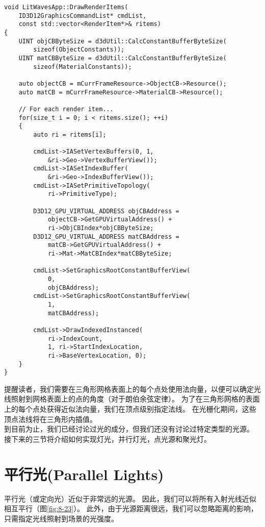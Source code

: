 \begin{lstlisting}
void LitWavesApp::DrawRenderItems(
    ID3D12GraphicsCommandList* cmdList, 
    const std::vector<RenderItem*>& ritems)
{
    UINT objCBByteSize = d3dUtil::CalcConstantBufferByteSize(
        sizeof(ObjectConstants));
    UINT matCBByteSize = d3dUtil::CalcConstantBufferByteSize(
        sizeof(MaterialConstants));

    auto objectCB = mCurrFrameResource->ObjectCB->Resource();
    auto matCB = mCurrFrameResource->MaterialCB->Resource();

    // For each render item...
    for(size_t i = 0; i < ritems.size(); ++i)
    {
        auto ri = ritems[i];

        cmdList->IASetVertexBuffers(0, 1, 
            &ri->Geo->VertexBufferView());
        cmdList->IASetIndexBuffer(
            &ri->Geo->IndexBufferView());
        cmdList->IASetPrimitiveTopology(
            ri->PrimitiveType);

        D3D12_GPU_VIRTUAL_ADDRESS objCBAddress = 
            objectCB->GetGPUVirtualAddress() + 
            ri->ObjCBIndex*objCBByteSize;
        D3D12_GPU_VIRTUAL_ADDRESS matCBAddress = 
            matCB->GetGPUVirtualAddress() + 
            ri->Mat->MatCBIndex*matCBByteSize;

        cmdList->SetGraphicsRootConstantBufferView(
            0, 
            objCBAddress);
        cmdList->SetGraphicsRootConstantBufferView(
            1, 
            matCBAddress);

        cmdList->DrawIndexedInstanced(
            ri->IndexCount, 
            1, ri->StartIndexLocation, 
            ri->BaseVertexLocation, 0);
    }
}
\end{lstlisting}

\begin{flushleft}
提醒读者，我们需要在三角形网格表面上的每个点处使用法向量，以便可以确定光线照射到网格表面上的点的角度（对于朗伯余弦定律）。 为了在三角形网格的表面上的每个点处获得近似法向量，我们在顶点级别指定法线。 在光栅化期间，这些顶点法线将在三角形内插值。\\
到目前为止，我们已经讨论过光的成分，但我们还没有讨论过特定类型的光源。 接下来的三节将介绍如何实现灯光，并行灯光，点光源和聚光灯。\\
\end{flushleft}

\section{平行光(Parallel Lights)}
\begin{flushleft}
平行光（或定向光）近似于非常远的光源。 因此，我们可以将所有入射光线近似相互平行（图\ref{fig:8-23}）。 此外，由于光源距离很远，我们可以忽略距离的影响，只需指定光线照射到场景的光强度。
\end{flushleft}

